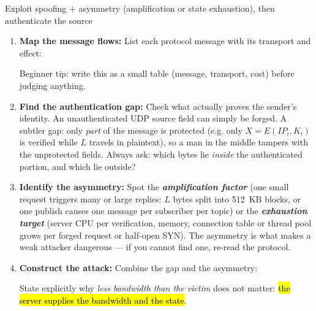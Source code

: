 \documentclass[12pt, a4paper]{article}
\newcommand{\term}[1]{\textbf{\textit{#1}}}        %
\newcommand{\imp}[1]{\hl{#1}}                       %
\begin{document}
\begin{schemebox}{Exploit spoofing + asymmetry (amplification or state exhaustion), then authenticate the source}
\begin{enumerate}[label=\textbf{Step \arabic*:}, leftmargin=*]
    \item \textbf{Map the message flows:} List each protocol message with its transport and effect:Beginner tip: write this as a small table (message, transport, cost) before judging anything.
    \item \textbf{Find the authentication gap:} Check what actually proves the sender's identity. An unauthenticated UDP source field can simply be forged. A subtler gap: only \emph{part} of the message is protected (e.g. only $X = E(IP_i, K_i)$ is verified while $L$ travels in plaintext), so a man in the middle tampers with the unprotected fields. Always ask: which bytes lie \emph{inside} the authenticated portion, and which lie outside?
    \item \textbf{Identify the asymmetry:} Spot the \term{amplification factor} (one small request triggers many or large replies: $L$ bytes split into 512~KB blocks, or one publish causes one message per subscriber per topic) or the \term{exhaustion target} (server CPU per verification, memory, connection table or thread pool grows per forged request or half-open SYN). The asymmetry is what makes a weak attacker dangerous --- if you cannot find one, re-read the protocol.
    \item \textbf{Construct the attack:} Combine the gap and the asymmetry:State explicitly why \emph{less bandwidth than the victim} does not matter: \imp{the server supplies the bandwidth and the state}.

\end{enumerate}
\end{schemebox}
\end{document}
